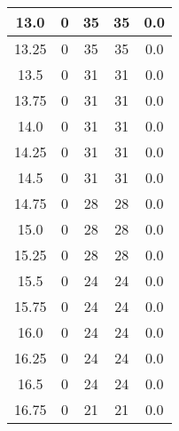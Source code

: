 \documentclass[letterpaper, 12pt]{article}
\begin{document}
\begin{longtable}{|c|c|c|c|c|}
\hline
13.0 & 0 & 35 & 35 & 0.0 \\
\hline
13.25 & 0 & 35 & 35 & 0.0 \\
\hline
13.5 & 0 & 31 & 31 & 0.0 \\
\hline
13.75 & 0 & 31 & 31 & 0.0 \\
\hline
14.0 & 0 & 31 & 31 & 0.0 \\
\hline
14.25 & 0 & 31 & 31 & 0.0 \\
\hline
14.5 & 0 & 31 & 31 & 0.0 \\
\hline
14.75 & 0 & 28 & 28 & 0.0 \\
\hline
15.0 & 0 & 28 & 28 & 0.0 \\
\hline
15.25 & 0 & 28 & 28 & 0.0 \\
\hline
15.5 & 0 & 24 & 24 & 0.0 \\
\hline
15.75 & 0 & 24 & 24 & 0.0 \\
\hline
16.0 & 0 & 24 & 24 & 0.0 \\
\hline
16.25 & 0 & 24 & 24 & 0.0 \\
\hline
16.5 & 0 & 24 & 24 & 0.0 \\
\hline
16.75 & 0 & 21 & 21 & 0.0 \\
\hline
\end{longtable}
\end{document}

